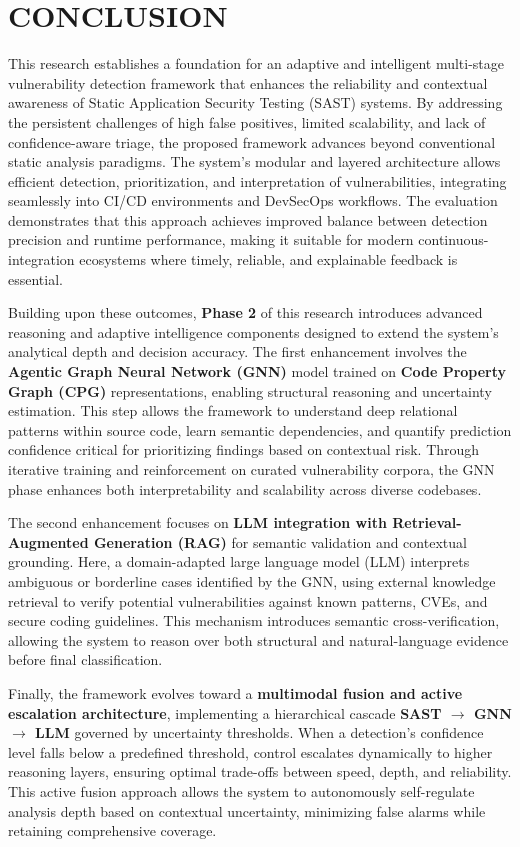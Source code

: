 \chapter{\uppercase{Conclusion}}

This research establishes a foundation for an adaptive and intelligent multi-stage vulnerability detection framework that enhances the reliability and contextual awareness of Static Application Security Testing (SAST) systems. By addressing the persistent challenges of high false positives, limited scalability, and lack of confidence-aware triage, the proposed framework advances beyond conventional static analysis paradigms. The system’s modular and layered architecture allows efficient detection, prioritization, and interpretation of vulnerabilities, integrating seamlessly into CI/CD environments and DevSecOps workflows. The evaluation demonstrates that this approach achieves improved balance between detection precision and runtime performance, making it suitable for modern continuous-integration ecosystems where timely, reliable, and explainable feedback is essential.

Building upon these outcomes, \textbf{Phase 2} of this research introduces advanced reasoning and adaptive intelligence components designed to extend the system’s analytical depth and decision accuracy. The first enhancement involves the \textbf{Agentic Graph Neural Network (GNN)} model trained on \textbf{Code Property Graph (CPG)} representations, enabling structural reasoning and uncertainty estimation. This step allows the framework to understand deep relational patterns within source code, learn semantic dependencies, and quantify prediction confidence critical for prioritizing findings based on contextual risk. Through iterative training and reinforcement on curated vulnerability corpora, the GNN phase enhances both interpretability and scalability across diverse codebases.

The second enhancement focuses on \textbf{LLM integration with Retrieval-Augmented Generation (RAG)} for semantic validation and contextual grounding. Here, a domain-adapted large language model (LLM) interprets ambiguous or borderline cases identified by the GNN, using external knowledge retrieval to verify potential vulnerabilities against known patterns, CVEs, and secure coding guidelines. This mechanism introduces semantic cross-verification, allowing the system to reason over both structural and natural-language evidence before final classification.

Finally, the framework evolves toward a \textbf{multimodal fusion and active escalation architecture}, implementing a hierarchical cascade   \textbf{SAST $\rightarrow$ GNN $\rightarrow$ LLM}   governed by uncertainty thresholds. When a detection’s confidence level falls below a predefined threshold, control escalates dynamically to higher reasoning layers, ensuring optimal trade-offs between speed, depth, and reliability. This active fusion approach allows the system to autonomously self-regulate analysis depth based on contextual uncertainty, minimizing false alarms while retaining comprehensive coverage.

